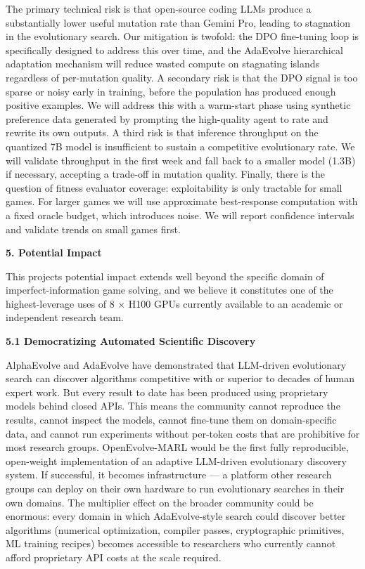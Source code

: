 The primary technical risk is that open-source coding LLMs produce a
substantially lower useful mutation rate than Gemini Pro, leading to
stagnation in the evolutionary search. Our mitigation is twofold: the
DPO fine-tuning loop is specifically designed to address this over time,
and the AdaEvolve hierarchical adaptation mechanism will reduce wasted
compute on stagnating islands regardless of per-mutation quality. A
secondary risk is that the DPO signal is too sparse or noisy early in
training, before the population has produced enough positive examples.
We will address this with a warm-start phase using synthetic preference
data generated by prompting the high-quality agent to rate and rewrite
its own outputs. A third risk is that inference throughput on the
quantized 7B model is insufficient to sustain a competitive evolutionary
rate. We will validate throughput in the first week and fall back to a
smaller model (1.3B) if necessary, accepting a trade-off in mutation
quality. Finally, there is the question of fitness evaluator coverage:
exploitability is only tractable for small games. For larger games we
will use approximate best-response computation with a fixed oracle
budget, which introduces noise. We will report confidence intervals and
validate trends on small games first.

\textbf{5. Potential Impact}

This project\textquotesingle s potential impact extends well beyond the
specific domain of imperfect-information game solving, and we believe it
constitutes one of the highest-leverage uses of 8 × H100 GPUs currently
available to an academic or independent research team.

\textbf{5.1 Democratizing Automated Scientific Discovery}

AlphaEvolve and AdaEvolve have demonstrated that LLM-driven evolutionary
search can discover algorithms competitive with or superior to decades
of human expert work. But every result to date has been produced using
proprietary models behind closed APIs. This means the community cannot
reproduce the results, cannot inspect the models, cannot fine-tune them
on domain-specific data, and cannot run experiments without per-token
costs that are prohibitive for most research groups. OpenEvolve-MARL
would be the first fully reproducible, open-weight implementation of an
adaptive LLM-driven evolutionary discovery system. If successful, it
becomes infrastructure --- a platform other research groups can deploy
on their own hardware to run evolutionary searches in their own domains.
The multiplier effect on the broader community could be enormous: every
domain in which AdaEvolve-style search could discover better algorithms
(numerical optimization, compiler passes, cryptographic primitives, ML
training recipes) becomes accessible to researchers who currently cannot
afford proprietary API costs at the scale required.

